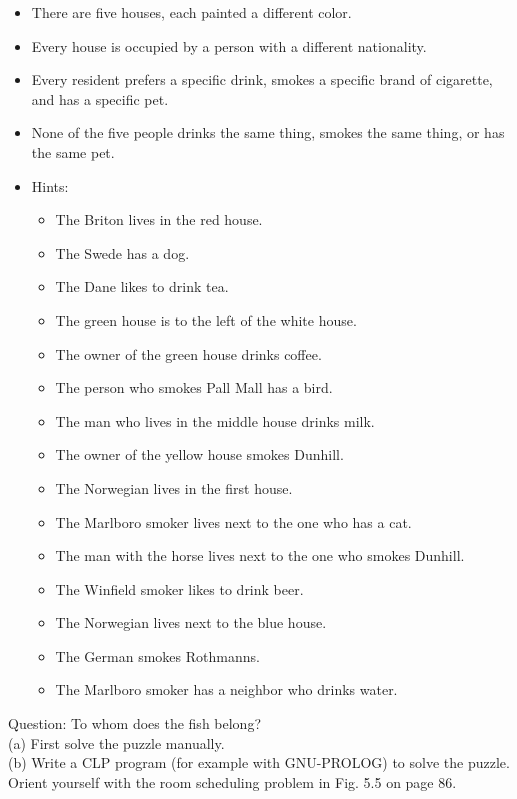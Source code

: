\documentclass[10pt]{book}
\begin{document}
\begin{itemize}
  \item There are five houses, each painted a different color.
  \item Every house is occupied by a person with a different nationality.
  \item Every resident prefers a specific drink, smokes a specific brand of cigarette, and has a specific pet.
  \item None of the five people drinks the same thing, smokes the same thing, or has the same pet.
  \item Hints:
    \begin{itemize}
      \item The Briton lives in the red house.
      \item The Swede has a dog.
      \item The Dane likes to drink tea.
      \item The green house is to the left of the white house.
      \item The owner of the green house drinks coffee.
      \item The person who smokes Pall Mall has a bird.
      \item The man who lives in the middle house drinks milk.
      \item The owner of the yellow house smokes Dunhill.
      \item The Norwegian lives in the first house.
      \item The Marlboro smoker lives next to the one who has a cat.
      \item The man with the horse lives next to the one who smokes Dunhill.
      \item The Winfield smoker likes to drink beer.
      \item The Norwegian lives next to the blue house.
      \item The German smokes Rothmanns.
      \item The Marlboro smoker has a neighbor who drinks water.
    \end{itemize}
\end{itemize}
Question: To whom does the fish belong?\\
(a) First solve the puzzle manually.\\
(b) Write a CLP program (for example with GNU-PROLOG) to solve the puzzle. Orient yourself with the room scheduling problem in Fig. 5.5 on page 86.
\end{document}

